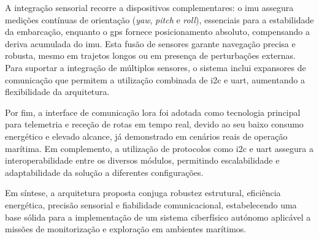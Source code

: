 A integração sensorial recorre a dispositivos complementares: o \gls{imu} assegura medições contínuas de orientação (\emph{yaw}, \emph{pitch} e \emph{roll}), essenciais para a estabilidade da embarcação, enquanto o \gls{gps} fornece posicionamento absoluto, compensando a deriva acumulada do \gls{imu}. Esta fusão de sensores garante navegação precisa e robusta, mesmo em trajetos longos ou em presença de perturbações externas. Para suportar a integração de múltiplos sensores, o sistema inclui expansores de comunicação que permitem a utilização combinada de \gls{i2c} e \gls{uart}, aumentando a flexibilidade da arquitetura.

Por fim, a interface de comunicação \gls{lora} foi adotada como tecnologia principal para telemetria e receção de rotas em tempo real, devido ao seu baixo consumo energético e elevado alcance, já demonstrado em cenários reais de operação marítima. Em complemento, a utilização de protocolos como \gls{i2c} e \gls{uart} assegura a interoperabilidade entre os diversos módulos, permitindo escalabilidade e adaptabilidade da solução a diferentes configurações.

Em síntese, a arquitetura proposta conjuga robustez estrutural, eficiência energética, precisão sensorial e fiabilidade comunicacional, estabelecendo uma base sólida para a implementação de um sistema ciberfísico autónomo aplicável a missões de monitorização e exploração em ambientes marítimos.
